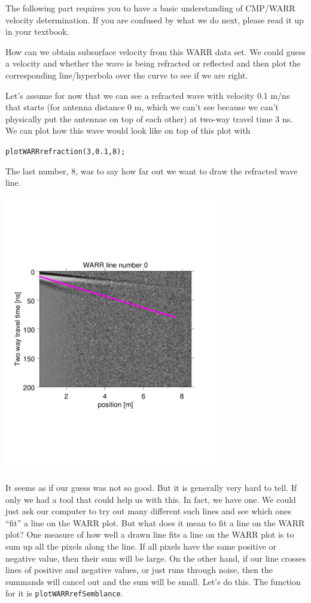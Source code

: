 \documentclass[11pt]{article}
\begin{document}
The following part requires you to have a basic understanding of
CMP/WARR velocity determination. If you are confused by what we do
next, please read it up in your textbook.
 
How can we obtain subsurface velocity from this WARR data set. We
could guess a velocity and whether the wave is being refracted or
reflected and then plot the corresponding line/hyperbola over the
curve to see if we are right.
 
Let's assume for now that we can see a refracted wave with velocity
0.1 m/ns that starts (for antenna distance 0 m, which we can't see
because we can't physically put the antennae on top of each other) at
two-way travel time 3 ns. We can plot how this wave would look like on
top of this plot with
 
\qquad \verb#plotWARRrefraction(3,0.1,8);#
  
The last number, 8, was to say how far out we want to draw the
  refracted wave line.
 
\begin{center}
\includegraphics[width=0.7\textwidth, trim = 0.9cm 6cm 2cm
  6.5cm,clip]{figures/WARRrefracted}
\end{center}

It seems as if our guess was not so good. But it is generally very
hard to tell. If only we had a tool that could help us with this. In
fact, we have one. We could just ask our computer to try out many
different such lines and see which ones ``fit'' a line on the WARR
plot. But what does it mean to fit a line on the WARR plot? One
measure of how well a drawn line fits a line on the WARR plot is to
sum up all the pixels along the line. If all pixels have the same
positive or negative value, then their sum will be large. On the other
hand, if our line crosses lines of positive and negative values, or
just runs through noise, then the summands will cancel out and the sum
will be small. Let's do this. The function for it is
\verb#plotWARRrefSemblance#.
\end{document}
